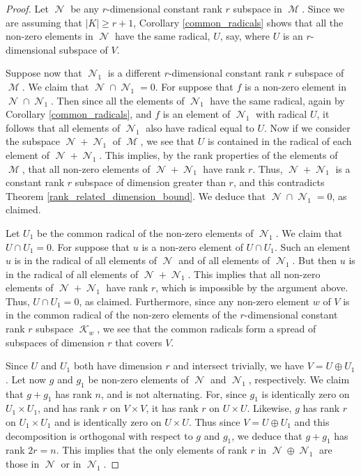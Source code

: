 \documentclass{amsart}
\DeclareMathOperator{\M}{\mathcal{M}}
\DeclareMathOperator{\N}{\mathcal{N}}
\DeclareMathOperator{\K}{\mathcal{K}}
\theoremstyle{plain}
\theoremstyle{definition}
\begin{document}
\begin{proof}
 Let $\N$ be any $r$-dimensional constant rank $r$ subspace in $\M$.  Since we are assuming that $|K|\geq r+1$,   
Corollary \ref{common_radicals} shows that all the non-zero elements in $\N$ have the same radical, $U$, say, where $U$ is an $r$-dimensional subspace of 
$V$. 

Suppose now that $\N_1$ is a different $r$-dimensional constant rank $r$ subspace of $\M$. We claim that $\N\cap \N_1=0$. For suppose that
$f$ is a non-zero element in $\N\cap \N_1$. Then since all the elements of $\N_1$ have the same radical, again by Corollary
\ref{common_radicals}, 
and $f$ is an element of $\N_1$ with radical $U$, it follows that all elements of $\N_1$ also have radical equal to $U$. 
Now if we 
consider the subspace $\N+\N_1$ of $\M$, we see that $U$ is contained in the radical of each element of $\N+\N_1$. This implies, by the rank 
properties of the elements of $\M$, that all non-zero elements of $\N+\N_1$ have rank $r$. Thus, $\N+\N_1$ is a constant rank $r$ subspace
of dimension greater than $r$, and this contradicts Theorem \ref{rank_related_dimension_bound}. We deduce that $\N\cap \N_1=0$, as claimed.

Let $U_1$ be the common radical of the non-zero elements of $\N_1$. We claim that $U\cap U_1=0$. 
For suppose that $u$ is a non-zero element of $U\cap U_1$. Such an element $u$ is in the radical of all elements of $\N$ and of all elements of $\N_1$.
But then $u$ is in the radical of all elements of $\N+\N_1$. This implies that all non-zero elements of $\N+\N_1$ have rank
$r$, which is impossible by the argument above. Thus, $U\cap U_1=0$, as claimed. Furthermore, since any non-zero element $w$ of $V$ is in the
common radical of the non-zero elements of the $r$-dimensional constant rank $r$ subspace $\K_w$, we see that the common radicals form a spread
of subspaces of dimension $r$ that covers $V$.

Since $U$ and $U_1$ both have dimension $r$ and intersect trivially, we have $V=U\oplus U_1$. Let now $g$ and $g_1$ be non-zero elements of $\N$
and $\N_1$, respectively. We claim that $g+g_1$ has rank $n$, and is not alternating. For, since $g_1$ is identically zero on $U_1\times U_1$,
and has rank $r$ on $V\times V$, it has rank $r$ on $U\times U$. Likewise, $g$ has rank $r$ on $U_1 \times U_1$ and is identically zero on
$U\times U$. Thus since $V=U\oplus U_1$ and this decomposition is orthogonal with respect to $g$ and $g_1$, we deduce that $g+g_1$ has rank $2r=n$.
This implies that
the only elements of rank $r$ in $\N\oplus \N_1$ are those in $\N$ or in $\N_1$.


\end{proof}
\end{document}
